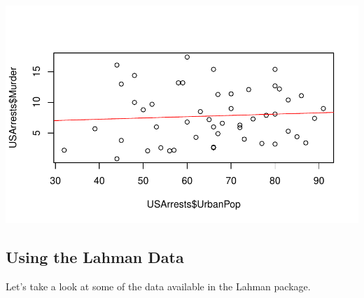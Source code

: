 \documentclass[]{book}
\theoremstyle{definition}
\theoremstyle{definition}
\theoremstyle{definition}
\theoremstyle{remark}
\begin{document}
\begin{center}\includegraphics[width=0.7\linewidth]{DS4PS-I_files/figure-latex/unnamed-chunk-19-1} \end{center}

\hypertarget{using-the-lahman-data}{%
\subsection{Using the Lahman Data}\label{using-the-lahman-data}}

Let's take a look at some of the data available in the Lahman package.
\end{document}
